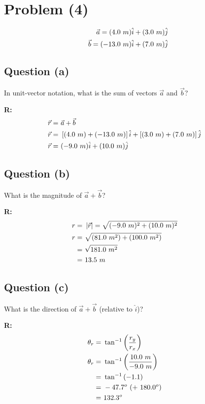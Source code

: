 \section{Problem (4)}

	\begin{align}
		\vec{a} = (4.0 \ m)\hat{i} + (3.0 \ m)\hat{j} \notag \\
		\vec{b} = (-13.0 \ m)\hat{i} + (7.0 \ m)\hat{j} \notag
	\end{align}

	\subsection{Question (a)}
		In unit-vector notation, what is the sum of vectors $\vec{a}$ and $\vec{b}$?

		\textbf{R:} \newline
		\begin{align}
			\vec{r} = \ &\vec{a} + \vec{b}& \notag \\
			\vec{r} = \ &\left[ (4.0 \ m) + (-13.0 \ m) \right] \hat{i} + \left[ (3.0 \ m) + (7.0 \ m) \right]\hat{j}& \notag \\
			\vec{r} = \ &(-9.0 \ m)\hat{i} + (10.0 \ m)\hat{j}&
		\end{align}


	\subsection{Question (b)}
		What is the magnitude of $\vec{a} + \vec{b}$?

		\textbf{R:} \newline
		\begin{align}
			r = \ &\left| \vec{r} \right| = \sqrt{(-9.0 \ m)^{2} + (10.0 \ m)^{2}}& \notag \\
			r = \ &\sqrt{(81.0 \ m^{2}) + (100.0 \ m^{2})}& \notag \\
			= \ &\sqrt{181.0 \ m^{2}}& \notag \\
			= \ &13.5 \ m&
		\end{align}

	\subsection{Question (c)}
		What is the direction of $\vec{a} + \vec{b}$ (relative to $\hat{i}$)?

		\textbf{R:} \newline
		\begin{align}
			\theta_{r} = \ &\tan^{-1} \left( \frac{r_{y}}{r_{x}} \right)& \notag \\
			\theta_{r} = \ &\tan^{-1} \left( \frac{10.0 \ m}{-9.0 \ m} \right)& \notag \\
			= \ &\tan^{-1} \left( -1.1 \right)& \notag \\
			= \ &-47.7^{o} \ (+ \ 180.0^{o})& \notag \\
			= \ &132.3^{o}&
		\end{align}
